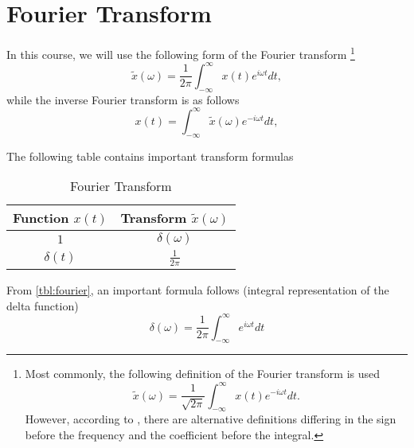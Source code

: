 \section{Fourier Transform}
\label{sec:cont_fourier}
In this course, we will use the following form of the Fourier transform
\footnote{
Most commonly, the following definition of the Fourier transform is used
\[
\tilde{x}\left(\omega\right) = \frac{1}{\sqrt{2 \pi}}
\int_{-\infty}^{\infty}x\left(t\right)e^{-i \omega t}dt.
\]
However, according to \cite{wiki:fourier_transform}, there are alternative definitions differing in the sign before the frequency and the coefficient before the integral.}
\begin{equation}
\tilde{x}\left(\omega\right) = \frac{1}{2 \pi}
\int_{-\infty}^{\infty}x\left(t\right)e^{i \omega t}dt,
\label{eq:direct_fourier}
\end{equation}
while the inverse Fourier transform is as follows
\begin{equation}
x\left(t\right) =
\int_{-\infty}^{\infty}\tilde{x}\left(\omega\right)e^{-i \omega t}dt, 
\label{eq:reverse_fourier}
\end{equation}

The following table contains important transform formulas
\begin{table}[H]
\centering
\begin{tabular}{|c|c|}
\hline
Function $x\left(t\right)$ &  Transform $\tilde{x}\left(\omega\right)$\\ \hline
$1$  & $\delta\left(\omega\right)$ \\
$\delta\left(t\right)$  & $\frac{1}{2 \pi}$  \\
\hline
\end{tabular}
\caption{Fourier Transform}
\label{tbl:fourier}
\end{table}

From \autoref{tbl:fourier}, an important formula follows (integral representation of the delta function) \cite{wiki:deltafunction}
\begin{equation}
\delta\left(\omega\right) = \frac{1}{2 \pi} \int_{-\infty}^{\infty}
e^{i \omega t} dt
\label{eq:delta_from_integral}
\end{equation}